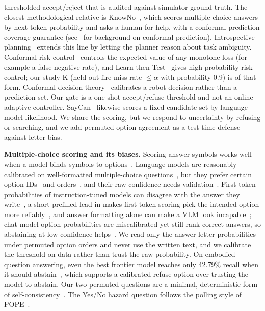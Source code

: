 \documentclass[conference]{IEEEtran}
\begin{document}
thresholded accept/reject that is audited against simulator ground truth.
The closest methodological relative is KnowNo~\cite{ren2023knowno}, which scores multiple-choice answers by
next-token probability and asks a human for help, with a conformal-prediction coverage guarantee (see~\cite{angelopoulos2021conformal} for background on conformal prediction).
Introspective planning~\cite{liang2024introspective} extends this line by letting the planner reason about task ambiguity.
Conformal risk control~\cite{angelopoulos2024conformalrisk} controls the expected value of any monotone loss (for example a false-negative rate), and Learn then Test~\cite{angelopoulos2025ltt}
gives high-probability risk control; our study K (held-out fire miss rate $\le\alpha$ with probability 0.9) is of that form. Conformal decision theory~\cite{lekeufack2024conformaldecision}
calibrates a robot decision rather than a prediction set. Our gate is a one-shot accept/refuse threshold and not an online-adaptive controller.
SayCan~\cite{ichter2023saycan} likewise scores a fixed candidate set by language-model likelihood.
We share the scoring, but we respond to uncertainty by refusing or searching, and we add permuted-option agreement as a
test-time defense against letter bias.

\textbf{Multiple-choice scoring and its biases.}
Scoring answer symbols works well when a model binds symbols to options~\cite{robinson2023mcqa}. Language models are reasonably calibrated on
well-formatted multiple-choice questions~\cite{kadavath2022know}, but they prefer certain option IDs~\cite{zheng2024mcselectors} and orders~\cite{pezeshkpour2024order}, and their raw confidence needs validation~\cite{guo2017calibration,zhao2021calibrate}. First-token probabilities of instruction-tuned models can disagree with the answer they write~\cite{wang2024myanswerisc}, a short prefilled lead-in makes first-token scoring pick the intended option more reliably~\cite{cappelletti2025prefilling}, and answer formatting alone can make a VLM look incapable~\cite{frontera2026readout}; chat-model option probabilities are miscalibrated yet still rank correct answers, so abstaining at low confidence helps~\cite{plaut2024miscalibrated}. We read only the answer-letter probabilities under permuted option orders and never use the written text, and we calibrate the threshold on data rather than trust the raw probability.
On embodied question answering, even the best frontier model reaches only 42.79\% recall when it should abstain~\cite{wu2025abstaineqa}, which supports a calibrated refuse option over trusting the model to abstain.
Our two permuted questions are a minimal, deterministic form of self-consistency~\cite{wang2023selfconsistency}.
The Yes/No hazard question follows the polling style of POPE~\cite{li2023pope}.
\end{document}
